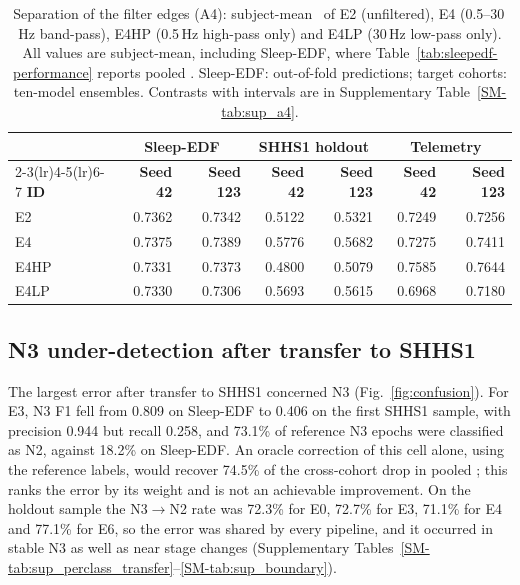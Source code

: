 \documentclass[11pt,a4paper]{article}
\newcommand{\mf}{\text{macro-F1}}
\begin{document}
\begin{table}[t]
\centering
\caption{Separation of the filter edges (A4): subject-mean \mf\ of E2 (unfiltered), E4 (0.5--30\,Hz
band-pass), E4HP (0.5\,Hz high-pass only) and E4LP (30\,Hz low-pass only). All values are subject-mean,
including Sleep-EDF, where Table~\ref{tab:sleepedf-performance} reports pooled \mf. Sleep-EDF:
out-of-fold predictions; target cohorts: ten-model ensembles. Contrasts with intervals are in Supplementary
Table~\ref{SM-tab:sup_a4}.}
\label{tab:edges}
\small
\begin{tabular}{lrrrrrr}
\toprule
& \multicolumn{2}{c}{\textbf{Sleep-EDF}} & \multicolumn{2}{c}{\textbf{SHHS1 holdout}} & \multicolumn{2}{c}{\textbf{Telemetry}} \\
\cmidrule(lr){2-3}\cmidrule(lr){4-5}\cmidrule(lr){6-7}
\textbf{ID} & \textbf{Seed 42} & \textbf{Seed 123} & \textbf{Seed 42} & \textbf{Seed 123} & \textbf{Seed 42} & \textbf{Seed 123} \\
\midrule
E2   & 0.7362 & 0.7342 & 0.5122 & 0.5321 & 0.7249 & 0.7256 \\
E4   & 0.7375 & 0.7389 & 0.5776 & 0.5682 & 0.7275 & 0.7411 \\
E4HP & 0.7331 & 0.7373 & 0.4800 & 0.5079 & 0.7585 & 0.7644 \\
E4LP & 0.7330 & 0.7306 & 0.5693 & 0.5615 & 0.6968 & 0.7180 \\
\bottomrule
\end{tabular}
\end{table}

\subsection{N3 under-detection after transfer to SHHS1}
\label{sec:n3}

The largest error after transfer to SHHS1 concerned N3 (Fig.~\ref{fig:confusion}). For E3, N3 F1 fell
from 0.809 on Sleep-EDF to 0.406 on the first SHHS1 sample, with precision 0.944 but recall 0.258, and
73.1\% of reference N3 epochs were classified as N2, against 18.2\% on Sleep-EDF. An oracle correction
of this cell alone, using the reference labels, would recover 74.5\% of the cross-cohort drop in
pooled \mf; this ranks the error by its weight and is not an achievable improvement. On the holdout
sample the N3$\rightarrow$N2 rate was 72.3\% for E0, 72.7\% for E3, 71.1\% for E4 and 77.1\% for E6,
so the error was shared by every pipeline, and it occurred in stable N3 as well as near stage changes
(Supplementary Tables~\ref{SM-tab:sup_perclass_transfer}--\ref{SM-tab:sup_boundary}).
\end{document}
